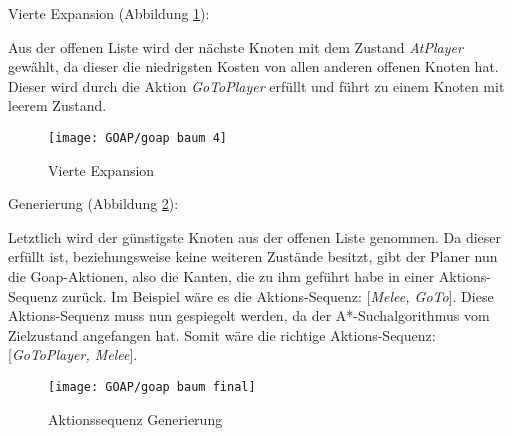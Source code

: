 \clearpage

Vierte Expansion (Abbildung \ref{fig:goap4}):

Aus der offenen Liste wird der n\"{a}chste Knoten mit dem Zustand \textit{AtPlayer} gew\"{a}hlt, da dieser die niedrigsten Kosten von allen anderen offenen Knoten hat. Dieser wird durch die Aktion \textit{GoToPlayer} erf\"{u}llt und f\"{u}hrt zu einem Knoten mit leerem Zustand.

\begin{figure}[h]
  \centering
  \texttt{[image: GOAP/goap baum 4]}
	\captionsetup{justification=justified, format=plain}
  \caption{Vierte Expansion}
  \label{fig:goap4}
\end{figure}

\clearpage

Generierung (Abbildung \ref{fig:goap5}):

Letztlich wird der g\"{u}nstigste Knoten aus der offenen Liste genommen. Da dieser erf\"{u}llt ist, beziehungsweise keine weiteren Zust\"{a}nde besitzt, gibt der Planer nun die Goap-Aktionen, also die Kanten, die zu ihm gef\"{u}hrt habe in einer Aktions-Sequenz zur\"{u}ck. Im Beispiel w\"{a}re es die Aktions-Sequenz: [\textit{Melee, GoTo}]. Diese Aktions-Sequenz muss nun gespiegelt werden, da der A*-Suchalgorithmus vom Zielzustand angefangen hat. Somit w\"{a}re die richtige Aktions-Sequenz: [\textit{GoToPlayer, Melee}].

\begin{figure}[h]
  \centering
  \texttt{[image: GOAP/goap baum final]}
	\captionsetup{justification=justified, format=plain}
  \caption{Aktionssequenz Generierung}
  \label{fig:goap5}
\end{figure}
